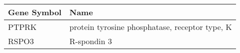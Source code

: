 \begin{tabular}{ll}
\toprule
Gene Symbol &                                           Name \\
\midrule
      PTPRK & protein tyrosine phosphatase, receptor type, K \\
      RSPO3 &                                    R-spondin 3 \\
\bottomrule
\end{tabular}
